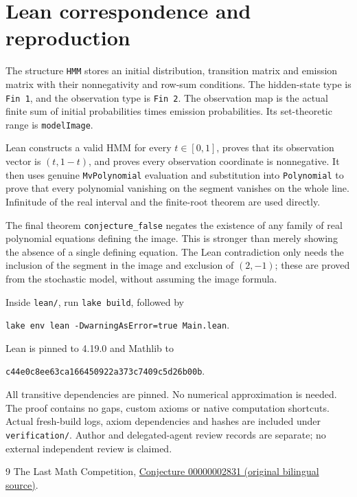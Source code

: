 \documentclass[11pt]{article}
\begin{document}
\section*{Lean correspondence and reproduction}
The structure \texttt{HMM} stores an initial distribution, transition matrix and emission matrix with their nonnegativity and row-sum conditions. The hidden-state type is \texttt{Fin 1}, and the observation type is \texttt{Fin 2}. The observation map is the actual finite sum of initial probabilities times emission probabilities. Its set-theoretic range is \texttt{modelImage}.

Lean constructs a valid HMM for every $t\in[0,1]$, proves that its observation vector is $(t,1-t)$, and proves every observation coordinate is nonnegative. It then uses genuine \texttt{MvPolynomial} evaluation and substitution into \texttt{Polynomial} to prove that every polynomial vanishing on the segment vanishes on the whole line. Infinitude of the real interval and the finite-root theorem are used directly.

The final theorem \texttt{conjecture\_false} negates the existence of any family of real polynomial equations defining the image. This is stronger than merely showing the absence of a single defining equation. The Lean contradiction only needs the inclusion of the segment in the image and exclusion of $(2,-1)$; these are proved from the stochastic model, without assuming the image formula.

Inside \texttt{lean/}, run \texttt{lake build}, followed by
\begin{center}\texttt{lake env lean -DwarningAsError=true Main.lean}.\end{center}
Lean is pinned to 4.19.0 and Mathlib to
\begin{center}\small\texttt{c44e0c8ee63ca166450922a373c7409c5d26b00b}.\end{center}
All transitive dependencies are pinned. No numerical approximation is needed. The proof contains no gaps, custom axioms or native computation shortcuts. Actual fresh-build logs, axiom dependencies and hashes are included under \texttt{verification/}. Author and delegated-agent review records are separate; no external independent review is claimed.

\begin{thebibliography}{9}
 The Last Math Competition,
\href{https://github.com/The-Last-Math-Competition/The-Last-Math-Competition/blob/main/conjectures/00000002831.md}{Conjecture 00000002831 (original bilingual source)}.
\end{thebibliography}
\end{document}
